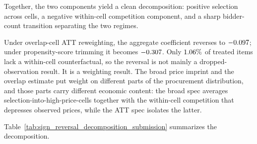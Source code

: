 Together, the two components yield a clean decomposition: positive
selection across cells, a negative within-cell competition
component, and a sharp bidder-count transition separating the two
regimes.

Under overlap-cell ATT reweighting, the aggregate coefficient
reverses to $-0.097$; under propensity-score
trimming it becomes $-0.307$. Only
$1.06\%$ of treated items lack a within-cell
counterfactual, so the reversal is not mainly a
dropped-observation result. It is a weighting result. The broad
price imprint and the overlap estimate put weight on different
parts of the procurement distribution, and those parts carry
different economic content: the broad spec averages
selection-into-high-price-cells together with the within-cell
competition that depresses observed prices, while the ATT spec
isolates the latter.

Table~\ref{tab:sign_reversal_decomposition_submission} summarizes
the decomposition.

